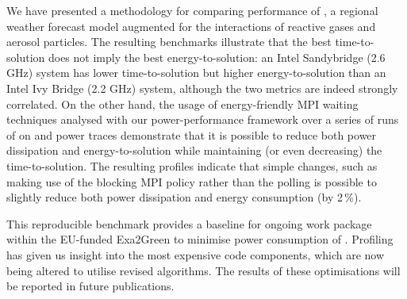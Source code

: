 We  have   presented  a  methodology  for   comparing  performance  of
\cosmoart,  a  regional  weather  forecast  model  augmented  for  the
interactions of  reactive gases and aerosol  particles.  The resulting
benchmarks illustrate  that the  best time-to-solution does  not imply
the best energy-to-solution: an Intel Sandybridge (2.6 GHz) system has
lower time-to-solution but higher energy-to-solution than an Intel Ivy
Bridge (2.2 GHz) system, although  the two metrics are indeed strongly
correlated.   On the  other  hand, the  usage  of energy-friendly  MPI
waiting techniques analysed  with our power-performance framework over
a series of  runs of \cosmoart on \tinto  and power traces demonstrate
that   it  is   possible  to   reduce  both   power   dissipation  and
energy-to-solution   while  maintaining   (or  even   decreasing)  the
time-to-solution. The resulting profiles indicate that simple changes,
such as making use of the  blocking MPI policy rather than the polling
is  possible to  slightly  reduce both  power  dissipation and  energy
consumption (by 2\,\%).

This  reproducible  benchmark provides  a  baseline  for ongoing  work
package within  the EU-funded Exa2Green to  minimise power consumption
of \cosmoart. Profiling  has given us insight into  the most expensive
code  components,  which are  now  being  altered  to utilise  revised
algorithms.  The  results of these  optimisations will be  reported in
future publications.
